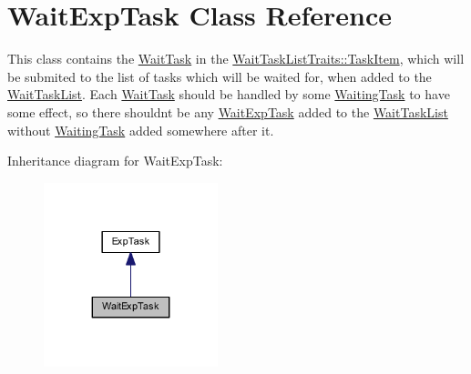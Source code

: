 \hypertarget{class_wait_exp_task}{}\section{Wait\+Exp\+Task Class Reference}
\label{class_wait_exp_task}


This class contains the \hyperlink{class_wait_task}{Wait\+Task} in the \hyperlink{struct_wait_task_list_traits_1_1_task_item}{Wait\+Task\+List\+Traits\+::\+Task\+Item}, which will be submited to the list of tasks which will be waited for, when added to the \hyperlink{class_wait_task_list}{Wait\+Task\+List}. Each \hyperlink{class_wait_task}{Wait\+Task} should be handled by some \hyperlink{class_waiting_task}{Waiting\+Task} to have some effect, so there shouldn\textquotesingle{}t be any \hyperlink{class_wait_exp_task}{Wait\+Exp\+Task} added to the \hyperlink{class_wait_task_list}{Wait\+Task\+List} without \hyperlink{class_waiting_task}{Waiting\+Task} added somewhere after it.  




Inheritance diagram for Wait\+Exp\+Task\+:\nopagebreak
\begin{figure}[H]
\begin{center}
\leavevmode
\includegraphics[width=143pt]{class_wait_exp_task__inherit__graph}
\end{center}
\end{figure}
